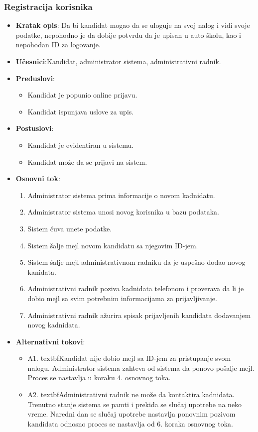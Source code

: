 \subsubsection{Registracija korisnika}
\label{subsubsec:registracija}
\begin{itemize}
  \item \textbf{Kratak opis}: Da bi kandidat mogao da se uloguje na svoj nalog i vidi svoje podatke, nepohodno je da dobije potvrdu da je upisan u auto školu, kao i nepohodan ID za logovanje.
  \item \textbf{Učesnici}:Kandidat, administrator sistema, administrativni radnik.
  \item \textbf{Preduslovi}:
    \begin{itemize}
    \item  Kandidat je popunio online prijavu.
    \item  Kandidat ispunjava uslove za upis.
    \end{itemize}
  \item \textbf{Postuslovi}:
      \begin{itemize}
      \item Kandidat je evidentiran u sistemu.
      \item Kandidat može da se prijavi na sistem.
      \end{itemize}
  \item \textbf{Osnovni tok}:
      \begin{enumerate}
        \item Administrator sistema prima informacije o novom kadnidatu.
        \item Administrator sistema unosi novog korisnika u bazu podataka.
        \item Sistem čuva unete podatke.
        \item Sistem šalje mejl novom kandidatu sa njegovim ID-jem.
        \item Sistem šalje mejl administrativnom radniku da je uspešno dodao novog kanidata.
        \item Administrativni radnik poziva kadnidata telefonom i proverava da li je dobio mejl sa svim potrebnim informacijama za prijavljivanje.
        \item Administrativni radnik ažurira spisak prijavljenih kandidata dodavanjem novog kadnidata.    
      \end{enumerate}

  \item \textbf{Alternativni tokovi}:
      \begin{itemize}
        \item A1. textbf{Kandidat nije dobio mejl sa ID-jem za pristupanje svom nalogu.}
        Administrator sistema zahteva od sistema da ponovo pošalje mejl. Proces se nastavlja u koraku 4. osnovnog toka.
        \item A2. textbf{Administrativni radnik ne može da kontaktira kadnidata.}
        Trenutno stanje sistema se pamti i prekida se slučaj upotrebe na neko vreme. Naredni dan se slučaj upotrebe nastavlja ponovnim pozivom kandidata odnosno proces se nastavlja od 6. koraka osnovnog toka.
      \end{itemize}
\end{itemize}
